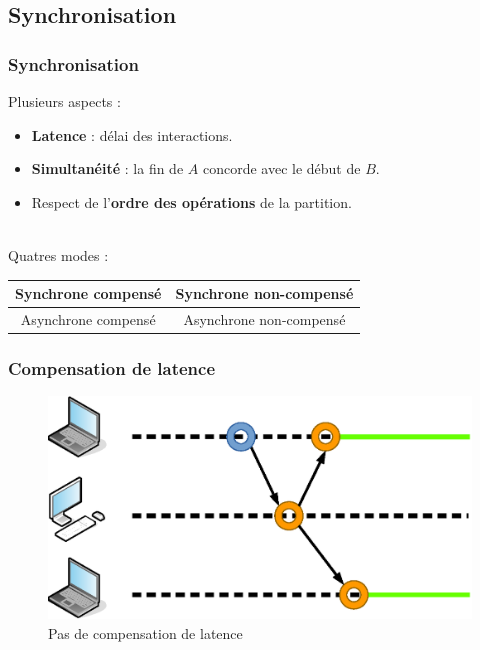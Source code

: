 \documentclass[]{beamer}
\begin{document}
\subsection{Synchronisation}
\begin{frame}
\frametitle{Synchronisation}
\Large
Plusieurs aspects : 
\large
\begin{itemize}
	\item \textbf{Latence} : délai des interactions.
	\item \textbf{Simultanéité} : la fin de $A$ concorde avec le début de $B$.
	\item Respect de l'\textbf{ordre des opérations} de la partition.
\end{itemize}
~\\
\Large Quatres modes : 
\large
\begin{table}
	\begin{tabular}{c|c}
	Synchrone compensé & Synchrone non-compensé \\
	\midrule
	Asynchrone compensé & Asynchrone non-compensé
	\end{tabular}
\end{table}

\end{frame}

\begin{frame}
\frametitle{Compensation de latence}
\begin{figure}
	\centering
	\includegraphics[width=\textwidth]{draw/noncompensated.eps}
	\caption{Pas de compensation de latence}
\end{figure}
\end{frame}
\end{document}
